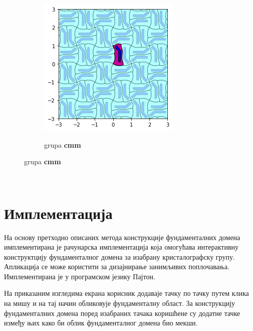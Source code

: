 \documentclass[12pt]{report}
\begin{document}
\begin{samepage}
\begin{figure}[H]
\begin{subfigure}[b]{0.3\textwidth}
  \end{subfigure}
  \begin{subfigure}[b]{0.3\textwidth}
    \includegraphics[width=\textwidth]{output_21_7.png}
    \label{fig:f25}
    \caption{grupa \textbf{cmm}}
  \end{subfigure}
\end{figure}
\end{samepage}

\quad \\ \qquad
    \chapter{Имплементација}\label{implementacija}

  На основу претходно описаних метода конструкције фундаменталних домена имплементирана је рачунарска имплементација која омогућава интерактивну конструктцију фундаменталног домена за изабрану кристалографску групу.
Апликација се може користити за дизајнирање занимљивих поплочавања.
Имплементирана је у програмском језику Пајтон.

На приказаним изгледима екрана корисник додаваје тачку по тачку путем клика на мишу и на тај начин обликовује фундаменталну област. За конструкцију фундаменталних домена поред изабраних тачака коришћене су додатне тачке између њих како би облик фундаменталног домена био мекши. 
\end{document}
